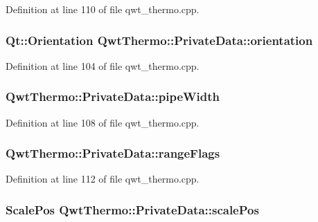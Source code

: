 Definition at line 110 of file qwt\-\_\-thermo.\-cpp.

\hypertarget{class_qwt_thermo_1_1_private_data_a8bd5ed0ab6d4bca41859db126d8cb97b}{
\subsubsection[{orientation}]{\setlength{\rightskip}{0pt plus 5cm}Qt\-::\-Orientation Qwt\-Thermo\-::\-Private\-Data\-::orientation}}\label{class_qwt_thermo_1_1_private_data_a8bd5ed0ab6d4bca41859db126d8cb97b}


Definition at line 104 of file qwt\-\_\-thermo.\-cpp.

\hypertarget{class_qwt_thermo_1_1_private_data_ace605b3b65ab961e331735bcb9078774}{
\subsubsection[{pipe\-Width}]{ Qwt\-Thermo\-::\-Private\-Data\-::pipe\-Width}}\label{class_qwt_thermo_1_1_private_data_ace605b3b65ab961e331735bcb9078774}


Definition at line 108 of file qwt\-\_\-thermo.\-cpp.

\hypertarget{class_qwt_thermo_1_1_private_data_afeec58c8385b9291d91bb01a90548e32}{
\subsubsection[{range\-Flags}]{ Qwt\-Thermo\-::\-Private\-Data\-::range\-Flags}}\label{class_qwt_thermo_1_1_private_data_afeec58c8385b9291d91bb01a90548e32}


Definition at line 112 of file qwt\-\_\-thermo.\-cpp.

\hypertarget{class_qwt_thermo_1_1_private_data_aa6c29e515f61b921c2083c6f1ad5ae50}{
\subsubsection[{scale\-Pos}]{\setlength{\rightskip}{0pt plus 5cm}Scale\-Pos Qwt\-Thermo\-::\-Private\-Data\-::scale\-Pos}}\label{class_qwt_thermo_1_1_private_data_aa6c29e515f61b921c2083c6f1ad5ae50}


